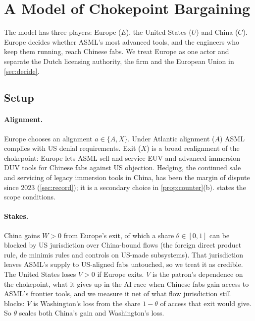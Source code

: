 \section{A Model of Chokepoint Bargaining}\label{sec:model}

The model has three players: Europe ($E$), the United States ($U$) and China ($C$). Europe decides whether ASML's most advanced tools, and the engineers who keep them running, reach Chinese fabs. We treat Europe as one actor and separate the Dutch licensing authority, the firm and the European Union in \cref{sec:decide}.

\subsection{Setup}\label{sec:setup}

\paragraph{Alignment.} Europe chooses an alignment $a\in\{A,X\}$. Under Atlantic alignment ($A$) ASML complies with US denial requirements. Exit ($X$) is a broad realignment of the chokepoint: Europe lets ASML sell and service EUV and advanced immersion DUV tools for Chinese fabs against US objection. Hedging, the continued sale and servicing of legacy immersion tools in China, has been the margin of dispute since 2023 (\cref{sec:record}); it is a secondary choice in \cref{prop:counter}(b).  states the scope conditions.

\paragraph{Stakes.} China gains $W>0$ from Europe's exit, of which a share $\theta\in[0,1]$ can be blocked by US jurisdiction over China-bound flows (the foreign direct product rule, de minimis rules and controls on US-made subsystems). That jurisdiction leaves ASML's supply to US-aligned fabs untouched, so we treat it as credible. The United States loses $V>0$ if Europe exits. $V$ is the patron's dependence on the chokepoint, what it gives up in the AI race when Chinese fabs gain access to ASML's frontier tools, and we measure it net of what flow jurisdiction still blocks: $V$ is Washington's loss from the share $1-\theta$ of access that exit would give. So $\theta$ scales both China's gain and Washington's loss.

